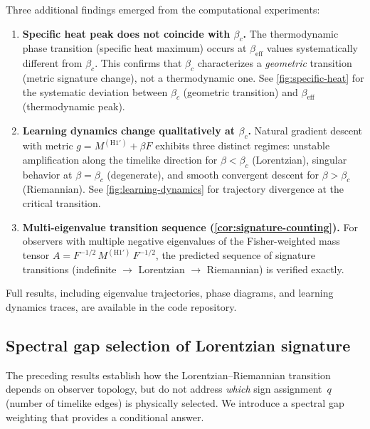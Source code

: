 \documentclass[11pt]{article}
\theoremstyle{definition}
\theoremstyle{remark}
\begin{document}
Three additional findings emerged from the computational experiments:
\begin{enumerate}
\item \textbf{Specific heat peak does not coincide with $\beta_c$.}
  The thermodynamic phase transition (specific heat maximum) occurs at
  $\beta_{\mathrm{eff}}$ values systematically different from $\beta_c$.
  This confirms that $\beta_c$ characterizes a \emph{geometric}
  transition (metric signature change), not a thermodynamic one.
  See \cref{fig:specific-heat} for the systematic deviation between
  $\beta_c$ (geometric transition) and $\beta_{\mathrm{eff}}$
  (thermodynamic peak).

\item \textbf{Learning dynamics change qualitatively at $\beta_c$.}
  Natural gradient descent with metric $g = M^{(\mathrm{H1'})} + \beta F$
  exhibits three distinct regimes: unstable amplification along the
  timelike direction for $\beta < \beta_c$ (Lorentzian), singular
  behavior at $\beta = \beta_c$ (degenerate), and smooth convergent
  descent for $\beta > \beta_c$ (Riemannian).
  See \cref{fig:learning-dynamics} for trajectory divergence at the
  critical transition.

\item \textbf{Multi-eigenvalue transition sequence
  (\cref{cor:signature-counting}).}
  For observers with multiple negative eigenvalues of the
  Fisher-weighted mass tensor $A = F^{-1/2}\,M^{(\mathrm{H1'})}\,F^{-1/2}$,
  the predicted sequence of signature transitions
  (indefinite $\to$ Lorentzian $\to$ Riemannian) is verified exactly.
\end{enumerate}

Full results, including eigenvalue trajectories, phase diagrams,
and learning dynamics traces, are available in the code repository.

\subsection{Spectral gap selection of Lorentzian signature}
\label{sec:spectral-gap-selection}

The preceding results establish how the Lorentzian--Riemannian transition
depends on observer topology, but do not address \emph{which} sign
assignment~$q$ (number of timelike edges) is physically selected.
We introduce a spectral gap weighting that provides a conditional answer.
\end{document}
